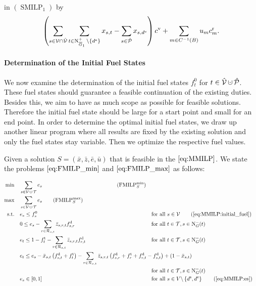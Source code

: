 in $(\operatorname{SMILP}_1)$ by
\begin{align*}
	\left(\sum_{s\in\mathcal{V}\cap\hat{\mathcal{V}}} \sum_{t\in\operatorname{N}^+_{\overline{G}_1}\backslash\left\{d^{\operatorname{e}}\right\}} x_{s,t} - \sum_{s\in\hat{\mathcal{P}}} x_{s,d^{\operatorname{e}}}\right) c^{\operatorname{v}} + \sum_{m\in C^{-1}(B)} u_m c^{\operatorname{r}}_m.
\end{align*}

\paragraph{Determination of the Initial Fuel States} \parfill

We now examine the determination of the initial fuel states $f^0_t$ for ${t\in\Vhat\cupdot\Phat}$. These fuel states should guarantee a feasible continuation of the existing duties. Besides this, we aim to have as much scope as possible for feasible solutions. Therefore the initial fuel state should be large for a start point and small for an end point. In order to determine the optimal initial fuel states, we draw up another linear program where all results are fixed by the existing solution and only the fuel states stay variable. Then we optimize the respective fuel values.

Given a solution ${S=\left(\bar{x},\bar{z},\bar{e},\bar{u}\right)}$ that is feasible in the $\eqref{eq:MMILP}$. We state the problems $\eqref{eq:FMILP_min}$ and $\eqref{eq:FMILP_max}$ as follows:

\begin{align}
	\min \quad & \sum_{s\in\mathcal{V}\cupdot\mathcal{T}} e_s \hphantom{\sum_{s\in\mathcal{V}} \sum_{t\in\Nout(s)\backslash\{d^{\operatorname{e}}\}} x_{s,t}\cv + u_m} \tag{$\operatorname{FMILP}^{\min}_S$} \label{eq:FMILP_min} \\
	\max \quad & \sum_{s\in\mathcal{V}\cupdot\mathcal{T}} e_s \tag{$\operatorname{FMILP}^{\max}_S$} \label{eq:FMILP_max} \\
	\text{s.t.} \quad & e_s \leq f_s^0 & & \text{for all } s\in\mathcal{V} \tag{\ref{eq:MMILP:initial_fuel}} \\
	& 0 \leq e_s - \sum_{r\in\Rst} \bar{z}_{s,r,t}\fd_{s,r} & & \text{for all } t\in\mathcal{T}, s\in\Nin(t) \label{eq:FMILP:min_fuel} \\
	& e_t \leq 1 - \ft_t - \sum_{r\in\Rst} \bar{z}_{s,r,t}\fd_{r,t} & & \text{for all } t\in\mathcal{T}, s\in\Nin(t) \label{eq:FMILP:max_fuel} \\
	& \omit\rlap{$\displaystyle{e_t \leq e_s - \bar{x}_{s,t}\left(f_{s,t}^{\operatorname{d}}+f_t^{\operatorname{t}}\right) - \sum_{r\in\Rst} \bar{z}_{s,r,t}\left(\fd_{s,r}+\ft_r+\fd_{r,t}-\fd_{s,t}\right) + \left(1-\bar{x}_{s,t}\right)}$} \nonumber \\
	& & & \text{for all } t\in\mathcal{T}, s\in\Nin(t) \label{eq:FMILP:fuel_consumption} \\
	& e_s\in[0,1] & & \text{for all } s\in V\backslash\left\{d^{\operatorname{s}},d^{\operatorname{e}}\right\} \tag{\ref{eq:MMILP:es}}
\end{align}

